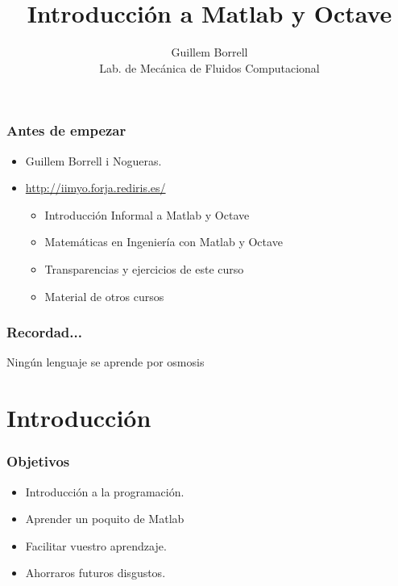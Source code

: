 \documentclass[12pt]{beamer}
\title{Introducción a Matlab y Octave}
\author{Guillem Borrell\\
Lab. de Mecánica de Fluidos Computacional}
\begin{document}

\begin{frame}
  \titlepage
\end{frame}

\begin{frame}
  \frametitle{Antes de empezar}
  \begin{itemize}
  \item Guillem Borrell i Nogueras.
  \item  \url{http://iimyo.forja.rediris.es/}
    \begin{itemize}
      \item Introducción Informal a Matlab y Octave
      \item Matemáticas en Ingeniería con Matlab y Octave
      \item Transparencias y ejercicios de este curso
      \item Material de otros cursos
    \end{itemize}
  \end{itemize}
\end{frame}


\begin{frame}
\frametitle{Recordad...}
\begin{center}
Ningún lenguaje se aprende por osmosis
\end{center}
\end{frame}


\begin{frame}
  \tableofcontents[pausesections]
\end{frame}

\section{Introducción}

\begin{frame}
  \frametitle{Objetivos}
  \begin{itemize}
  \item Introducción a la programación.
  \item Aprender un poquito de Matlab
  \item Facilitar vuestro aprendzaje.
  \item Ahorraros futuros disgustos.
  \end{itemize}
\end{frame}
\end{document}
